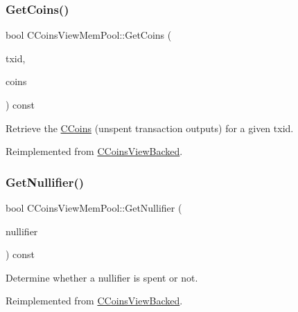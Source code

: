 \subsubsection{\texorpdfstring{Get\+Coins()}{GetCoins()}}
{\footnotesize\ttfamily bool C\+Coins\+View\+Mem\+Pool\+::\+Get\+Coins (\begin{DoxyParamCaption}\item[{const \mbox{\hyperlink{classuint256}{uint256}} \&}]{txid,  }\item[{\mbox{\hyperlink{class_c_coins}{C\+Coins}} \&}]{coins }\end{DoxyParamCaption}) const\hspace{0.3cm}{\ttfamily [virtual]}}



Retrieve the \mbox{\hyperlink{class_c_coins}{C\+Coins}} (unspent transaction outputs) for a given txid. 



Reimplemented from \mbox{\hyperlink{class_c_coins_view_backed_a456f9e85817556329a959c120998df5b}{C\+Coins\+View\+Backed}}.

\mbox{\label{class_c_coins_view_mem_pool_ac76524f89eb1a8c25e3c6c3201d3662a}} 
\subsubsection{\texorpdfstring{Get\+Nullifier()}{GetNullifier()}}
{\footnotesize\ttfamily bool C\+Coins\+View\+Mem\+Pool\+::\+Get\+Nullifier (\begin{DoxyParamCaption}\item[{const \mbox{\hyperlink{classuint256}{uint256}} \&}]{nullifier }\end{DoxyParamCaption}) const\hspace{0.3cm}{\ttfamily [virtual]}}



Determine whether a nullifier is spent or not. 



Reimplemented from \mbox{\hyperlink{class_c_coins_view_backed_afbfee79b18b475d67cd757a7dc4f5955}{C\+Coins\+View\+Backed}}.

\mbox{\label{class_c_coins_view_mem_pool_a2c5900448dc5570053060686ad1f014b}} 
